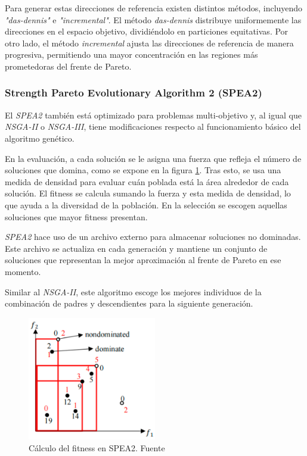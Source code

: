 Para generar estas direcciones de referencia existen distintos métodos, incluyendo \textit{"das-dennis"} e \textit{"incremental"}. El método \textit{das-dennis} distribuye uniformemente las direcciones en el espacio objetivo, dividiéndolo en particiones equitativas. Por otro lado, el método \textit{incremental} ajusta las direcciones de referencia de manera progresiva, permitiendo una mayor concentración en las regiones más prometedoras del frente de Pareto.

\subsubsection{Strength Pareto Evolutionary Algorithm 2 (SPEA2)}
\label{ch:spea2}

El \textit{SPEA2} también está optimizado para problemas multi-objetivo y, al igual que \textit{NSGA-II} o \textit{NSGA-III}, tiene modificaciones respecto al funcionamiento básico del algoritmo genético.

En la evaluación, a cada solución se le asigna una fuerza que refleja el número de soluciones que domina, como se expone en la figura \ref{fig:spea2}. Tras esto, se usa una medida de densidad para evaluar cuán poblada está la área alrededor de cada solución. El fitness se calcula sumando la fuerza y esta medida de densidad, lo que ayuda a la diversidad de la población. En la selección se escogen aquellas soluciones que mayor fitness presentan.

\textit{SPEA2} hace uso de un archivo externo para almacenar soluciones no dominadas. Este archivo se actualiza en cada generación y mantiene un conjunto de soluciones que representan la mejor aproximación al frente de Pareto en ese momento.

Similar al \textit{NSGA-II}, este algoritmo escoge los mejores individuos de la combinación de padres y descendientes para la siguiente generación.~\cite{pymoo_spea2}

\begin{figure}[H]
  \centering
  \includegraphics[width=0.5\textwidth]{figures/spea2.png}
  \caption{Cálculo del fitness en SPEA2. Fuente \cite{spea2_imagen}}
  \label{fig:spea2}
\end{figure}
\newpage
